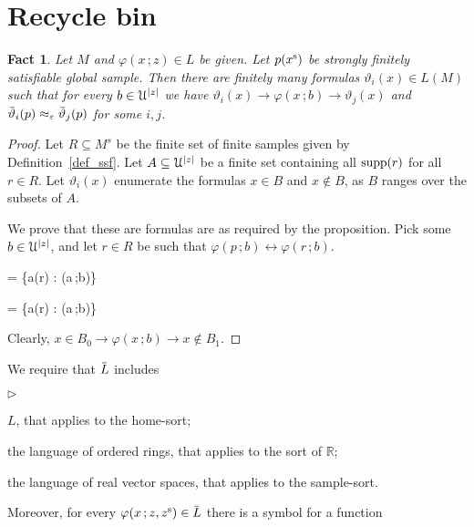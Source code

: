 \documentclass[10pt,openany]{article}
\newcommand{\mylabel}[1]{{\ssf{#1}}\hfill}
\renewenvironment{itemize}
  {\begin{list}{$\triangleright$}{%
   \setlength{\parskip}{0mm}
   \setlength{\topsep}{.4\baselineskip}
   \setlength{\rightmargin}{0mm}
   \setlength{\listparindent}{0mm}
   \setlength{\itemindent}{0mm}
   \setlength{\labelwidth}{3ex}
   \setlength{\itemsep}{.4\baselineskip}
   \setlength{\parsep}{0mm}
   \setlength{\partopsep}{0mm}
   \setlength{\labelsep}{1ex}
   \setlength{\leftmargin}{\labelwidth+\labelsep}
   \let\makelabel\mylabel}}{%
   \end{list}\vspace*{-\parskip}
  }
\def\RR{\mathds R}
\def\supp{\mathop{\rm supp}}
\newcommand{\sbar}[1]{\mkern 3mu\overline{\mkern-3mu#1\mkern-1mu}\mkern 1mu}
\newcommand{\barL}{\mkern 2.5mu\overline{\mkern-2.5mu L\mkern-3.5mu}\mkern 3.5mu}
\def\imp{\rightarrow}
\def\iff{\leftrightarrow}
\def\U{\EuScript U}
\def\theta{\vartheta}
\def\phi{\varphi}
\def\epsilon{\varepsilon}
\def\ssf#1{\textsf{\small #1}}
\newcounter{thm}[section]
\theoremstyle{mio}
\newtheorem{fact}[thm]{Fact}
\theoremstyle{liscio}
\begin{document}
\section{Recycle bin}

\begin{fact}
  Let $M$ and $\phi(x\,;z)\in L$ be given.
  Let $p(x^{\rm s})$ be strongly finitely satisfiable global sample.
  Then there are finitely many formulas $\theta_i(x)\in L(M)$ such that for every $b\in\U^{|z|}$ we have $\theta_i(x)\imp\phi(x\,;b)\imp\theta_j(x)$ and $\sbar\theta_i(p)\approx_\epsilon\sbar\theta_j(p)$ for some $i,j$.
\end{fact}

\begin{proof}
  Let $R\subseteq M^s$ be the finite set of finite samples given by Definition~\ref{def_ssf}. 
  Let $A\subseteq\U^{|z|}$ be a finite set containing all $\supp(r)$ for all $r\in R$. 
  Let $\theta_i(x)$ enumerate the formulas $x\in B$ and $x\notin B$, as $B$ ranges over the subsets of $A$.
  
  We prove that these are formulas are as required by the proposition. Pick some $b\in\U^{|z|}$, and let $r\in R$ be such that $\phi(p\,;b)\iff\phi(r\,;b)$. 

  {=}
  {\{a\in\supp(r) : \phi(a\,;b)\}}
  
  {=}
  {\{a\in\supp(r) : \neg\phi(a\,;b)\}}

  Clearly, $x\in B_0\imp \phi(x\,;b)\imp x\notin B_1$.




\end{proof}

We require that $\barL$ includes
\begin{itemize}
  \item[1.] $L$, that applies to the home-sort;
  \item[2.] the language of ordered rings, that applies to the sort of $\RR$;
  \item[3.] the language of real vector spaces, that applies to the sample-sort.
\end{itemize}
Moreover, for every $\phi(x\,;z,z^{\rm s})\in\barL$ there is a symbol for a function
\end{document}
